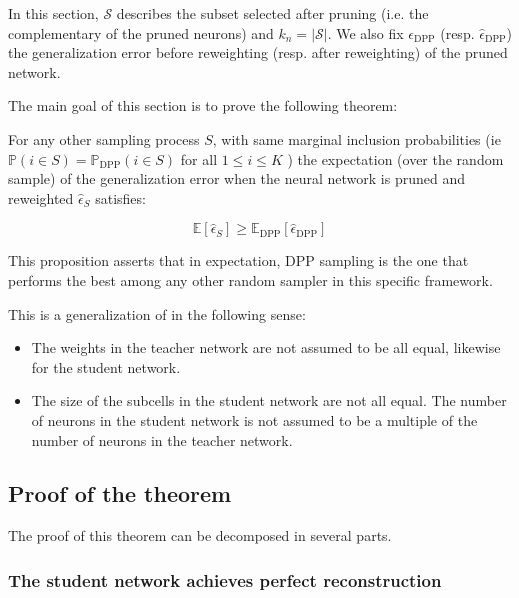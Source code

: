  In this section, $\mathcal{S}$ describes the subset selected after pruning (i.e. the complementary of the pruned neurons) and $k_n = \lvert \mathcal{S} \rvert$. We also fix $\epsilon_{\operatorname{DPP}}$ (resp. $\hat{\epsilon}_{\operatorname{DPP}}$) the generalization error before reweighting (resp. after reweighting) of the pruned network.

The main goal of this section is to prove the following theorem:

\begin{theorem} \label{thm:nndpp}
    For any other sampling process $S$, with same marginal inclusion probabilities (ie $\mathbb{P}( i \in S) = \mathbb{P}_{\operatorname{DPP}}(i \in S)$ for all $1 \leq i \leq K$ ) the expectation (over the random sample) of the generalization error when the neural network is pruned and reweighted $\hat{\epsilon}_S$ satisfies:

    \[ \mathbb{E} [\hat{\epsilon}_S] \geq \mathbb{E}_{\operatorname{DPP}} [\hat{\epsilon}_{\operatorname{DPP}}] \]

\end{theorem}

This proposition asserts that in expectation, DPP sampling is the one that performs the best among any other random sampler in this specific framework.

\begin{remark}
    This is a generalization of \cite{acharyya_statistical_2021} in the following sense:
    \begin{itemize}
        \item The weights in the teacher network are not assumed to be all equal, likewise for the student network.
        \item The size of the subcells in the student network are not all equal. The number of neurons in the student network is not assumed to be a multiple of the number of neurons in the teacher network.
    \end{itemize}
\end{remark}

\subsection{Proof of the theorem}

The proof of this theorem can be decomposed in several parts.

\subsubsection{The student network achieves perfect reconstruction}

